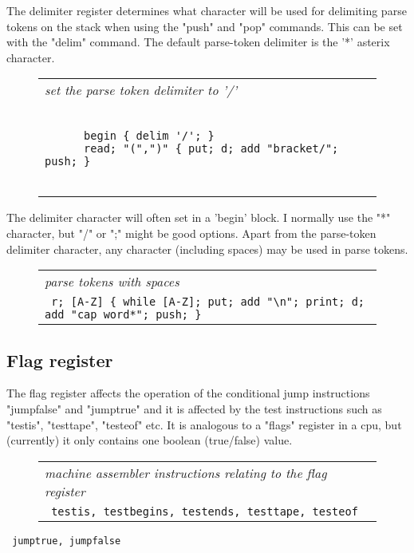 \documentclass[a4paper,12pt]{article}
\begin{document}
  The delimiter register determines what character will be used for
  delimiting parse tokens on the stack when using the "push" and "pop"
  commands. This can be set with the "delim" command. The default
  parse-token delimiter is the '*' asterix character.
 \begin{figure}
 \begin{tabular}{ l }
 \emph{ set the parse token delimiter to '/' } \\ 
 \begin{lstlisting}[breaklines] 

      begin { delim '/'; }
      read; "(",")" { put; d; add "bracket/"; push; }  
    
 \end{lstlisting} 
 \end{tabular} 

 \end{figure}

  The delimiter character will often set in a 'begin' block. I normally use
  the "*" character, but "/" or ";" might be good options. Apart from the
  parse-token delimiter character, any character (including spaces) may be used
  in parse tokens.
 \begin{figure}
 \begin{tabular}{ l }
 \emph{ parse tokens with spaces  } \\ 
 \verb| r; [A-Z] { while [A-Z]; put; add "\n"; print; d; add "cap word*"; push; } |
 \end{tabular} 
 \end{figure}

\subsection{Flag register}

  The flag register affects the operation of the conditional jump instructions
  "jumpfalse" and "jumptrue" and it is affected by the test instructions such
  as "testis", "testtape", "testeof" etc. It is analogous to a "flags"
  register in a cpu, but (currently) it only contains one boolean (true/false)
  value.
 \begin{figure}
 \begin{tabular}{ l }
 \emph{ machine assembler instructions relating to the flag register } \\ 
 \verb| testis, testbegins, testends, testtape, testeof  |
 \end{tabular} 
 \end{figure} 
 \verb| jumptrue, jumpfalse |
\end{document}
